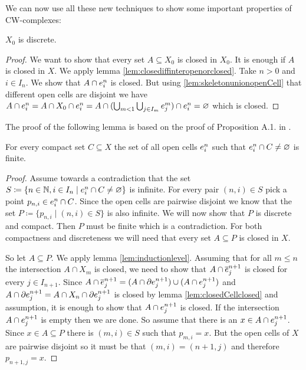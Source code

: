 We can now use all these new techniques to show some important properties of CW-complexes: 

\begin{lem}
    $X_0$ is discrete.
\end{lem}
\begin{proof}
    We want to show that every set $A \subseteq X_0$ is closed in $X_0$.
    It is enough if $A$ is closed in $X$. 
    We apply lemma \ref{lem:closediffinteropenorclosed}. 
    Take $n > 0$ and $i \in I_n$. 
    We show that $A \cap \openCell{n}{i}$ is closed. 
    But using \ref{lem:skeletonunionopenCell} that different open cells are disjoint we have $A \cap \openCell{n}{i} = A \cap X_0 \cap \openCell{n}{i} = A \cap (\bigcup_{m < 1}\bigcup_{j \in I_m}\openCell{m}{j}) \cap \openCell{n}{i} = \varnothing$ which is closed.
\end{proof}

The proof of the following lemma is based on the proof of Proposition A.1. in \cite{Hatcher2001}.

\begin{lem}
    For every compact set $C \subseteq X$ the set of all open cells $\openCell{n}{i}$ such that $\openCell{n}{i} \cap C \ne \varnothing$ is finite.
\end{lem}
\begin{proof}
    Assume towards a contradiction that the set $S \coloneq \{n \in \bN, i \in I_n \mid \openCell{n}{i} \cap C \ne \varnothing \}$ is infinite. 
    For every pair $(n, i) \in S$ pick a point $p_{n, i} \in \openCell{n}{i} \cap C$. 
    Since the open cells are pairwise disjoint we know that the set $P \coloneq \{p_{n, i} \mid (n, i) \in S\}$ is also infinite.
    We will now show that $P$ is discrete and compact. 
    Then $P$ must be finite which is a contradiction.
    For both compactness and discreteness we will need that every set $A \subseteq P$ is closed in $X$.

    So let $A \subseteq P$. 
    We apply lemma \ref{lem:inductionlevel}. 
    Assuming that for all $m \le n$ the intersection $A \cap X_m$ is closed, we need to show that $A \cap \closedCell{n + 1}{j}$ is closed for every $j \in I_{n + 1}$.
    Since $A \cap \closedCell{n + 1}{j} = (A \cap \cellFrontier{n + 1}{j}) \cup (A \cap \openCell{n + 1}{j})$ and $A \cap \cellFrontier{n + 1}{j} = A \cap X_{n} \cap \cellFrontier{n + 1}{j}$ is closed by lemma \ref{lem:closedCellclosed} and assumption, it is enough to show that $A \cap \openCell{n + 1}{j}$ is closed. 
    If the intersection $A \cap \openCell{n + 1}{j}$ is empty then we are done. 
    So assume that there is an $x \in A \cap \openCell{n + 1}{j}$. 
    Since $x \in A \subseteq P$ there is $(m, i) \in S$ such that $p_{m, i} = x$. 
    But the open cells of $X$ are pairwise disjoint so it must be that $(m, i) = (n + 1, j)$ and therefore $p_{n + 1, j} = x$.
\end{proof}